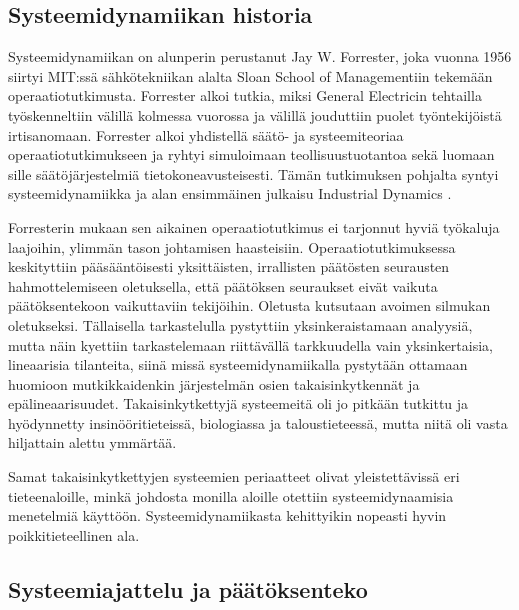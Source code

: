\documentclass[finnish,12pt,a4paper,pdftex]{article}
\begin{document}
\begin{onehalfspacing}
\subsection{Systeemidynamiikan historia \label{sysdyn:historia}} 


Systeemidynamiikan on alunperin perustanut Jay W. Forrester, joka vuonna 1956 siirtyi MIT:ssä sähkötekniikan alalta Sloan School of Managementiin tekemään operaatiotutkimusta. Forrester alkoi tutkia, miksi General Electricin tehtailla työskenneltiin välillä kolmessa vuorossa ja välillä jouduttiin puolet työntekijöistä irtisanomaan. Forrester alkoi yhdistellä säätö- ja systeemiteoriaa operaatiotutkimukseen ja ryhtyi simuloimaan teollisuustuotantoa sekä luomaan sille säätöjärjestelmiä tietokoneavusteisesti. Tämän tutkimuksen pohjalta syntyi systeemidynamiikka ja alan ensimmäinen julkaisu Industrial Dynamics \cite{Forrester1961}. \cite{Forrester1989} 

Forresterin \cite[s. 398--399]{Forrester1968} mukaan sen aikainen operaatiotutkimus ei tarjonnut hyviä työkaluja laajoihin, ylimmän tason johtamisen haasteisiin. Operaatiotutkimuksessa keskityttiin pääsääntöisesti yksittäisten, irrallisten päätösten seurausten hahmottelemiseen oletuksella, että päätöksen seuraukset eivät vaikuta päätöksentekoon vaikuttaviin tekijöihin. Oletusta kutsutaan avoimen silmukan oletukseksi. Tällaisella tarkastelulla pystyttiin yksinkeraistamaan analyysiä, mutta näin kyettiin tarkastelemaan riittävällä tarkkuudella vain yksinkertaisia, lineaarisia tilanteita, siinä missä systeemidynamiikalla pystytään ottamaan huomioon mutkikkaidenkin järjestelmän osien takaisinkytkennät ja epälineaarisuudet. Takaisinkytkettyjä systeemeitä oli jo pitkään tutkittu ja hyödynnetty insinööritieteissä, biologiassa ja taloustieteessä, mutta niitä oli vasta hiljattain alettu ymmärtää. 

Samat takaisinkytkettyjen systeemien periaatteet olivat yleistettävissä eri tieteenaloille, minkä johdosta monilla aloille otettiin systeemidynaamisia menetelmiä käyttöön. Systeemidynamiikasta kehittyikin nopeasti hyvin poikkitieteellinen ala. \cite{WhatIsSystemDynamics, Forrester1968, Sterman2000} %



\subsection{Systeemiajattelu ja päätöksenteko \label{sysdyn:paatos}}


\end{onehalfspacing}
\end{document}
